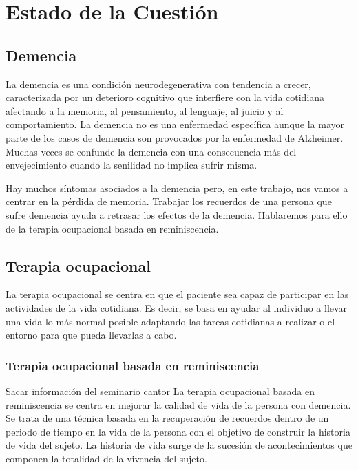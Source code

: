 \chapter{Estado de la Cuestión}
\label{cap:estadoDeLaCuestion}

\section{Demencia}
La demencia \citep{demencia} es una condición neurodegenerativa con tendencia a crecer, caracterizada por un deterioro cognitivo que interfiere con la vida cotidiana afectando a la memoria, al pensamiento, al lenguaje, al juicio y al comportamiento. La demencia no es una enfermedad específica aunque la mayor parte de los casos de demencia son provocados por la enfermedad de Alzheimer. Muchas veces se confunde la demencia con una consecuencia más del envejecimiento cuando la senilidad no implica sufrir misma.

Hay muchos síntomas asociados a la demencia pero, en este trabajo, nos vamos a centrar en la pérdida de memoria. Trabajar los recuerdos de una persona que sufre demencia ayuda a retrasar los efectos de la demencia. Hablaremos para ello de la terapia ocupacional basada en reminiscencia.

\section{Terapia ocupacional}
La terapia ocupacional \citep{terapia} se centra en que el paciente sea capaz de participar en las actividades de la vida cotidiana. Es decir, se basa en ayudar al individuo a llevar una vida lo más normal posible adaptando las tareas cotidianas a realizar o el entorno para que pueda llevarlas a cabo.

\subsection{Terapia ocupacional basada en reminiscencia}
Sacar información del seminario cantor
La terapia ocupacional basada en reminiscencia se centra en mejorar la calidad de vida de la persona con demencia. Se trata de una técnica basada en la recuperación de recuerdos dentro de un periodo de tiempo en la vida de la persona con el objetivo de construir la historia de vida del sujeto. La historia de vida surge de la sucesión de acontecimientos que componen la totalidad de la vivencia del sujeto.



